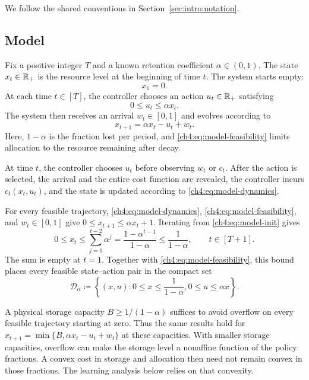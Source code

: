 We follow the shared conventions in Section~\ref{sec:intro:notation}.

\subsection{Model}
\label{ch4:sec:model-setup}

Fix a positive integer $T$ and a known retention coefficient
$\alpha\in(0,1)$. The state $x_t\in\mathbb{R}_+$ is the resource level at the
beginning of time $t$. The system starts empty:
\begin{equation}
\label{ch4:eq:model-init}
x_1=0.
\end{equation}
At each time $t\in[T]$, the controller chooses an action
$u_t\in\mathbb{R}_+$ satisfying
\begin{equation}
\label{ch4:eq:model-feasibility}
0\le u_t\le\alpha x_t.
\end{equation}
The system then receives an arrival $w_t\in[0,1]$ and evolves according to
\begin{equation}
\label{ch4:eq:model-dynamics}
x_{t+1}=\alpha x_t-u_t+w_t.
\end{equation}
Here, $1-\alpha$ is the fraction lost per period, and
\eqref{ch4:eq:model-feasibility} limits allocation to the resource remaining
after decay.

At time $t$, the controller chooses $u_t$ before observing $w_t$ or $c_t$. After the
action is selected, the arrival and the entire cost function are revealed, the
controller incurs $c_t(x_t,u_t)$, and the state is updated according to
\eqref{ch4:eq:model-dynamics}.

For every feasible trajectory, \eqref{ch4:eq:model-dynamics},
\eqref{ch4:eq:model-feasibility}, and $w_t\in[0,1]$ give
$0\le x_{t+1}\le\alpha x_t+1$. Iterating from
\eqref{ch4:eq:model-init} gives
\begin{equation}
\label{ch4:eq:model-state-bound}
0\le x_t
\le\sum_{j=0}^{t-2}\alpha^j
=\frac{1-\alpha^{t-1}}{1-\alpha}
\le\frac{1}{1-\alpha},
\qquad t\in[T+1].
\end{equation}
The sum is empty at $t=1$.
Together with \eqref{ch4:eq:model-feasibility}, this bound places every feasible
state--action pair in the compact set
\begin{equation}
\label{ch4:eq:model-domain}
\mathcal{D}_\alpha
\coloneqq
\left\{
(x,u):
0\le x\le\frac{1}{1-\alpha},
0\le u\le\alpha x
\right\}.
\end{equation}

\begin{Thm:Remark}
\label{ch4:rem:storage-capacity}
A physical storage capacity $B\ge1/(1-\alpha)$ suffices to avoid overflow
on every feasible trajectory starting at zero. Thus the same results hold for
$x_{t+1}=\min\{B,\alpha x_t-u_t+w_t\}$ at these capacities. With smaller
storage capacities, overflow can make the storage level a nonaffine function
of the policy fractions. A convex cost in storage and allocation then need
not remain convex in those fractions. The learning analysis below relies on
that convexity.
\end{Thm:Remark}

